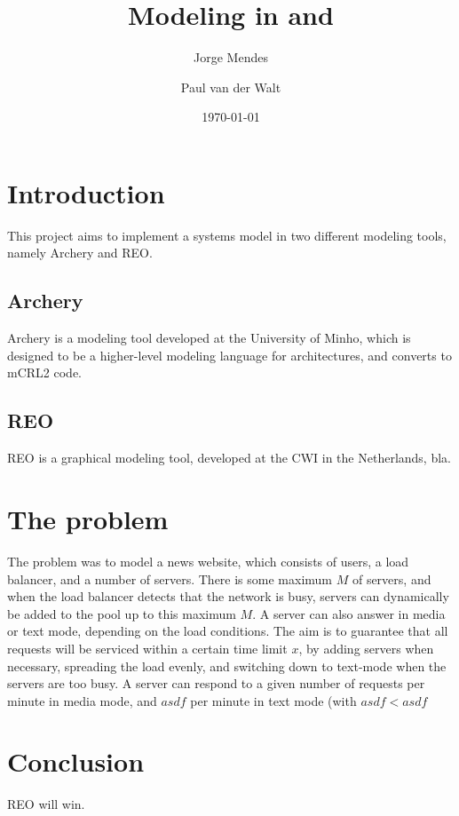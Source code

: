 \documentclass[a4paper]{article}
\author{Jorge Mendes \and Paul van der Walt}
\date{\today}
\title{Modeling in \ar and \re}
\newcommand{\ar}{Archery\xspace}
\newcommand{\re}{REO\xspace}
\begin{document}
\maketitle

\section{Introduction}

This project aims to implement a systems model in two different modeling tools,
namely \ar and \re.

\subsection{\ar}

\ar is a modeling tool developed at the University of Minho, which is designed
to be a higher-level modeling language for architectures, and converts to mCRL2
code. 

\subsection{\re}

\re is a graphical modeling tool, developed at the CWI in the Netherlands, bla.

\section{The problem}

The problem was to model a news website, which consists of users, a load
balancer, and a number of servers. There is some maximum $M$ of servers, and
when the load balancer detects that the network is busy, servers can dynamically
be added to the pool up to this maximum $M$. A server can also answer in media
or text mode, depending on the load conditions. The aim is to guarantee that all
requests will be serviced within a certain time limit $x$, by adding servers
when necessary, spreading the load evenly, and switching down to text-mode when
the servers are too busy. A server can respond to a given number of requests per
minute in media mode, and $asdf$ per minute in text mode (with $asdf<asdf$

\section{Conclusion}

\re will win. 
\end{document}
